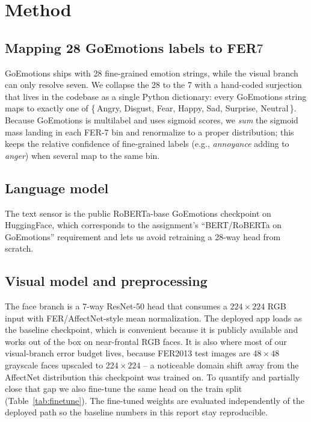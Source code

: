 \documentclass[sigconf,nonacm]{acmart}
\begin{document}
  \section{Method}
  \subsection{Mapping 28 GoEmotions labels to FER\texorpdfstring{$7$}{\,7}}
  GoEmotions ships with 28 fine-grained emotion strings, while the visual branch can only resolve seven. We collapse the 28 to the 7 with a hand-coded surjection that lives in the codebase as a single Python dictionary: every GoEmotions string maps to exactly one of \{\,Angry, Disgust, Fear, Happy, Sad, Surprise, Neutral\,\}. Because GoEmotions is multilabel and uses sigmoid scores, we \emph{sum} the sigmoid mass landing in each FER-7 bin and renormalize to a proper distribution; this keeps the relative confidence of fine-grained labels (e.g., \emph{annoyance} adding to \emph{anger}) when several map to the same bin.

  \subsection{Language model}
  The text sensor is the public RoBERTa-base GoEmotions checkpoint  on HuggingFace, which corresponds to the assignment's ``BERT/RoBERTa on GoEmotions'' requirement and lets us avoid retraining a 28-way head from scratch.

  \subsection{Visual model and preprocessing}
  The face branch is a 7-way ResNet-50 head that consumes a $224\!\times\!224$ RGB input with FER/AffectNet-style mean normalization. The deployed app loads  as the baseline checkpoint, which is convenient because it is publicly available and works out of the box on near-frontal RGB faces. It is also where most of our visual-branch error budget lives, because FER2013 test images are 48$\!\times\!48$ grayscale faces upscaled to 224$\!\times\!224$ -- a noticeable domain shift away from the AffectNet distribution this checkpoint was trained on. To quantify and partially close that gap we also fine-tune the same head on the  train split (Table~\ref{tab:finetune}). The fine-tuned weights are evaluated independently of the deployed path so the baseline numbers in this report stay reproducible.
\end{document}

